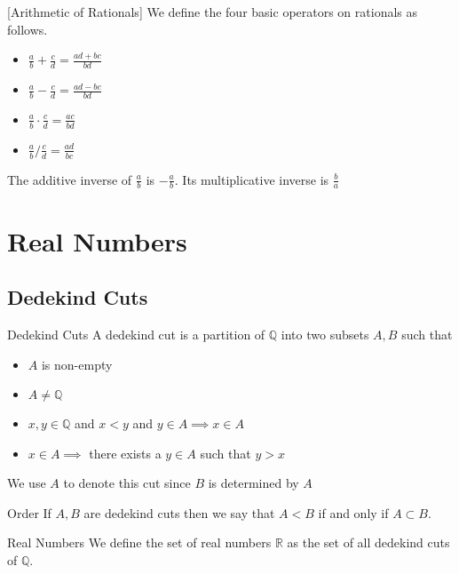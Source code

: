 \begin{defn}{}{}[Arithmetic of Rationals] We define the four basic operators on rationals as follows. 
\begin{itemize}
\item $\frac{a}{b}+\frac{c}{d}=\frac{ad+bc}{bd}$
\item $\frac{a}{b}-\frac{c}{d}=\frac{ad-bc}{bd}$
\item $\frac{a}{b}\cdot\frac{c}{d}=\frac{ac}{bd}$
\item $\frac{a}{b}/\frac{c}{d}=\frac{ad}{bc}$
\end{itemize}
\end{defn}

\begin{prp}{}{} The additive inverse of $\frac{a}{b}$ is $-\frac{a}{b}$. Its multiplicative inverse is $\frac{b}{a}$
\end{prp}

\pagebreak
\section{Real Numbers}
\subsection{Dedekind Cuts}
\begin{defn}{Dedekind Cuts}{} A dedekind cut is a partition of $\mathbb{Q}$ into two subsets $A,B$ such that
\begin{itemize}
\item $A$ is non-empty
\item $A\neq\mathbb{Q}$
\item $x,y\in\mathbb{Q}$ and $x<y$ and $y\in A\implies x\in A$
\item $x\in A\implies$ there exists a $y\in A$ such that $y>x$
\end{itemize}
We use $A$ to denote this cut since $B$ is determined by $A$
\end{defn}

\begin{defn}{Order}{} If $A,B$ are dedekind cuts then we say that $A<B$ if and only if $A\subset B$. 
\end{defn}

\begin{defn}{Real Numbers}{} We define the set of real numbers $\mathbb{R}$ as the set of all dedekind cuts of $\mathbb{Q}$. 
\end{defn}

